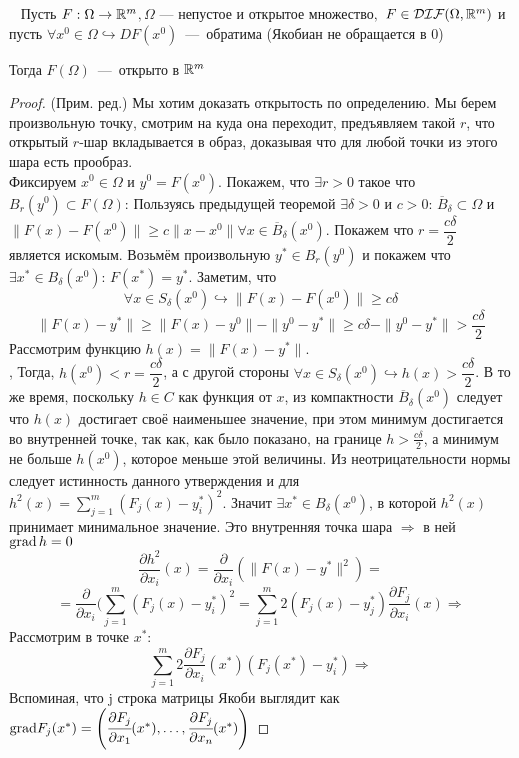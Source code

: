 \begin{theorem}
    \ \newline
    Пусть $F: \Omega \rightarrow \mathbb{R}^m$$, \Omega \text{~---~непустое и открытое множество},$
    $ F \in \mathcal{DIF}(\Omega, \mathbb{R}^m)$ и пусть $\forall x^0 \in \Omega \hookrightarrow DF(x^0)$~---~обратима (Якобиан не обращается в 0)
    
    Тогда $F(\Omega)$~---~открыто в $\mathbb{R}^m$
\end{theorem}
\begin{proof}
    (Прим. ред.) Мы хотим доказать открытость по определению. Мы берем произвольную точку, смотрим на куда она переходит, предъявляем такой $r$, что открытый $r$-шар вкладывается в образ, доказывая что для любой точки из этого шара есть прообраз. \\
    
    Фиксируем $x^0 \in \Omega$ и $y^0 = F(x^0)$. Покажем, что $\exists r > 0$ такое что $B_r(y^0) \subset F(\Omega)$: 
    Пользуясь предыдущей теоремой $\exists \delta > 0$ и $c > 0$: $\overline{B}_\delta \subset \Omega$ и $\|F(x) - F(x^0)\| \geq c \|x - x^0\| \forall x \in \overline{B}_\delta(x^0)$. Покажем что $r = \dfrac{c\delta}{2}$ является искомым. Возьмём произвольную $y^* \in B_{r}(y^0)$ и покажем что $\exists x^* \in B_\delta(x^0)$: $F(x^*) = y^*$. Заметим, что
    \[\forall x \in S_\delta (x^0) \hookrightarrow \|F(x) - F(x^0)\| \geq c\delta \]
    \[\|F(x) - y^*\| \geq \|F(x) - y^0\| - \|y^0 - y^*\| \geq c\delta - \|y^0 - y^*\| > \dfrac{c\delta}{2}\]
    Рассмотрим функцию $h(x) = \|F(x) - y^*\|$. \\
,    Тогда, $h(x^0) < r = \dfrac{c\delta}{2}$, а с другой стороны $\forall x \in S_\delta (x^0) \hookrightarrow h(x) > \dfrac{c\delta}{2}$. В то же время, поскольку $h \in C$ как функция от $x$, из компактности $\overline{B}_\delta(x^0)$ следует что $h(x)$ достигает своё наименьшее значение, при этом минимум достигается во внутренней точке, так как, как было показано, на границе $h > \frac{c\delta}{2}$, а минимум не больше $h(x^0)$, которое меньше этой величины. Из неотрицательности нормы следует истинность данного утверждения и для $h^2(x) = \sum\limits_{j = 1}^m(F_j(x) - y_i^*)^2$. Значит $\exists x^* \in B_\delta(x^0)$, в которой $h^2(x)$ принимает минимальное значение. Это внутренняя точка шара $\Rightarrow$ в ней $\operatorname{grad} h = 0$
    \[\dfrac{\partial h^2}{\partial x_i}(x) = \dfrac{\partial}{\partial x_i}(\|F(x) - y^*\|^2) = \]
    \[= \dfrac{\partial}{\partial x_i}(\sum\limits_{j = 1}^m(F_j(x) - y_i^*)^2 = \sum\limits_{j = 1}^m 2(F_j(x) - y^*_j) \dfrac{\partial F_j}{\partial x_i}(x) \Rightarrow \]
    Рассмотрим в точке $x^*$:
    \[\sum\limits_{j = 1}^m 2\dfrac{\partial F_j}{\partial x_i}(x^*) (F_j(x^*) - y_i^*)\Rightarrow\]
    Вспоминая, что j строка матрицы Якоби выглядит как $\text{grad}F_{j} (x^{*}) = \left(\cfrac{\partial F_{j}}{\partial x_{1}} (x^{*}), \ldots, \cfrac{\partial F_{j}}{\partial x_{n}} (x^{*})\right)$
    

\end{proof}
